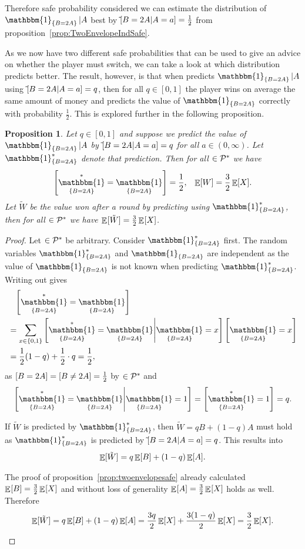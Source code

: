 \documentclass[twoside,a4paper]{article}
\theoremstyle{plain}
\newtheorem{proposition}[theorem]{Proposition}
\theoremstyle{definition}
\theoremstyle{remark}
\numberwithin{equation}{section}
\let\P\relax
\DeclareMathOperator{\P}{\mathbb{P}}
\DeclareMathOperator{\E}{\mathbb{E}}
\DeclareMathOperator{\1}{\mathbbm{1}}
\newcommand{\Pmod}{\mathcal{P}^*}
\newcommand{\Psafe}{\tilde{\P}}
\newcommand{\EnvIndSafe}{\1_{\{B=2A\}}}
\begin{document}
Therefore safe probability considered we can estimate the distribution of $\EnvIndSafe|A$ best by $\Psafe[B=2A|A=a]=\frac{1}{2}$ from proposition~\ref{prop:TwoEnvelopeIndSafe}.

As we now have two different safe probabilities that can be used to give an advice on whether the player must switch, we can take a look at which distribution predicts better. The result, however, is that when predicts $\EnvIndSafe|A$ using $\Psafe[B=2A|A=a]=q$, then for all $q\in[0,1]$ the player wins on average the same amount of money and predicts the value of $\EnvIndSafe$ correctly with probability $\frac{1}{2}$. This is explored further in the following proposition.

\begin{proposition}\label{prop:TwoEnvelopePropHalf}
Let $q\in[0,1]$ and suppose we predict the value of $\EnvIndSafe|A$ by $\Psafe[B=2A|A=a]=q$ for all $a\in(0,\infty)$. Let $\EnvIndSafe^*$ denote that prediction. Then for all $\P\in\Pmod$ we have
\begin{align*}
\P\left[\EnvIndSafe^*=\EnvIndSafe\right]&=\frac{1}{2},&\E_{\P}[W]=\frac{3}{2}\E_{\P}[X].
\end{align*}
Let $\tilde{W}$ be the value won after a round by predicting using $\EnvIndSafe^*$, then for all $\P\in\Pmod$ we have $\E_{\P}[\tilde{W}]=\frac{3}{2}\E_{\P}[X]$.
\end{proposition}
\begin{proof}
Let $\P\in\Pmod$ be arbitrary. Consider $\EnvIndSafe^*$ first. The random variables $\EnvIndSafe^*$ and $\EnvIndSafe$ are independent as the value of $\EnvIndSafe$ is not known when predicting $\EnvIndSafe^*$. Writing out gives
\begin{align*}
&\phantom{=}\P\left[\EnvIndSafe^*=\EnvIndSafe\right]\\
&=\sum_{x\in\{0,1\}}\P\left[\EnvIndSafe^*=\EnvIndSafe\middle|\EnvIndSafe=x\right]\P\left[\EnvIndSafe=x\right]\\
&=\frac{1}{2}(1-q)+\frac{1}{2}\cdot q=\frac{1}{2},
\end{align*}
as $\P[B=2A]=\P[B\neq2A]=\frac{1}{2}$ by $\P\in\Pmod$ and 
\[\P\left[\EnvIndSafe^*=\EnvIndSafe\middle|\EnvIndSafe=1\right]=\P\left[\EnvIndSafe^*=1\right]=q.\]

If $\tilde{W}$ is predicted by $\EnvIndSafe^*$, then $\tilde{W}=qB+(1-q)A$ must hold as $\EnvIndSafe^*$ is predicted by $\Psafe[B=2A|A=a]=q$. This results into
\[\E_{\P}[\tilde{W}]=q\E_{\P}[B]+(1-q)\E_{\P}[A].\]
The proof of proposition~\ref{prop:twoenvelopesafe} already calculated $\E_{\P}[B]=\frac{3}{2}\E_{\P}[X]$ and without loss of generality $\E_{\P}[A]=\frac{3}{2}\E_{\P}[X]$ holds as well. Therefore
\[\E_{\P}[\tilde{W}]=q\E_{\P}[B]+(1-q)\E_{\P}[A]=\frac{3q}{2}\E_{\P}[X]+\frac{3(1-q)}{2}\E_{\P}[X]=\frac{3}{2}\E_{\P}[X].\]
\end{proof}
\end{document}
